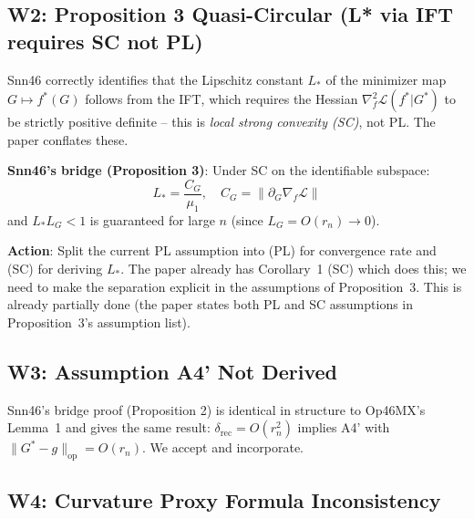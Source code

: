 \documentclass{article}
\begin{document}
\subsection{W2: Proposition 3 Quasi-Circular (L* via IFT requires SC not PL)}

\begin{accept}
Snn46 correctly identifies that the Lipschitz constant $L_*$ of the minimizer
map $G \mapsto f^*(G)$ follows from the IFT, which requires the Hessian
$\nabla^2_f \mathcal{L}(f^*|G^*)$ to be strictly positive definite -- this is
\emph{local strong convexity (SC)}, not PL. The paper conflates these.

\textbf{Snn46's bridge (Proposition 3)}: Under SC on the identifiable subspace:
\[
  L_* = \frac{C_G}{\mu_1}, \quad C_G = \|\partial_G \nabla_f \mathcal{L}\|
\]
and $L_* L_G < 1$ is guaranteed for large $n$ (since $L_G = O(r_n) \to 0$).

\textbf{Action}: Split the current PL assumption into (PL) for convergence rate
and (SC) for deriving $L_*$. The paper already has Corollary~1 (SC) which does
this; we need to make the separation explicit in the assumptions of Proposition~3.
This is already partially done (the paper states both PL and SC assumptions in
Proposition~3's assumption list).
\end{accept}

\subsection{W3: Assumption A4' Not Derived}

\begin{accept}
Snn46's bridge proof (Proposition 2) is identical in structure to Op46MX's
Lemma~1 and gives the same result: $\delta_{\mathrm{rec}} = O(r_n^2)$ implies
A4' with $\|G^* - g\|_{\mathrm{op}} = O(r_n)$. We accept and incorporate.
\end{accept}

\subsection{W4: Curvature Proxy Formula Inconsistency}
\end{document}
